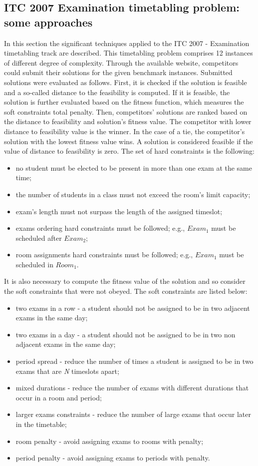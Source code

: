 \subsection{ITC 2007 Examination timetabling problem: some approaches}
\label{subsection:ApprITC2007}

In this section the significant techniques applied to the ITC 2007 - Examination timetabling track are described. This timetabling problem comprises 12 instances of different degree of complexity. Through the available website, competitors could submit their solutions for the given benchmark instances. Submitted solutions were evaluated as follows. First, it is checked if the solution is feasible and a so-called distance to the feasibility is computed. If it is feasible, the solution is further evaluated based on the fitness function, which measures the soft constraints total penalty. Then, competitors' solutions are ranked based on the distance to feasibility and solution's fitness value. The competitor with lower distance to feasibility value is the winner. In the case of a tie, the competitor's solution with the lowest fitness value wins. A solution is considered feasible if the value of distance to feasibility is zero. The set of hard constraints is the following:
\begin{itemize}
	\item no student must be elected to be present in more than one exam at the same time;
	\item the number of students in a class must not exceed the room's limit capacity;
	\item exam's length must not surpass the length of the assigned timeslot;
	\item exams ordering hard constraints must be followed; e.g., $Exam_1$ must be scheduled after $Exam_2$;
	\item room assignments hard constraints must be followed; e.g., 	$Exam_1$ must be scheduled in $Room_1$.
\end{itemize}

It is also necessary to compute the fitness value of the solution and so consider the soft constraints that were not obeyed. The soft constraints are listed below:
\begin{itemize}
	\item two exams in a row - a student should not be assigned to be in two adjacent exams in the same day;
	\item two exams in a day - a student should not be assigned to be in two non adjacent exams in the same day;
	\item period spread - reduce the number of times a student is assigned to be in two exams that are \textit{N} timeslots apart;
	\item mixed durations - reduce the number of exams with different durations that occur in a room and period;
	\item larger exams constraints - reduce the number of large exams that occur later in the timetable;
	\item room penalty - avoid assigning exams to rooms with penalty;
	\item period penalty - avoid assigning exams to periods with penalty.
\end{itemize}

